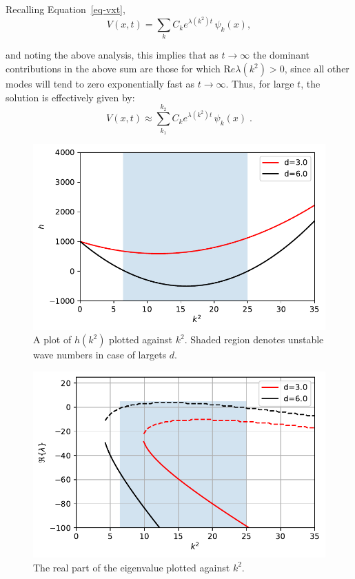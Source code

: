 \documentclass[
  letterpaper,
  DIV=11,
  numbers=noendperiod]{scrreprt}
\theoremstyle{plain}
\theoremstyle{definition}
\theoremstyle{plain}
\theoremstyle{remark}
\begin{document}
Recalling Equation~\ref{eq-vxt},\\
\[
V(x,t) = \sum_k C_k e^{\lambda(k^2) t} \, \psi_k(x),
\]

and noting the above analysis, this implies that as \(t\to \infty\) the
dominant contributions in the above sum are those for which
\({\mathrm Re} \lambda(k^2) > 0\), since all other modes will tend to
zero exponentially fast as \(t\to \infty\). Thus, for large \(t\), the
solution is effectively given by: \[
V(x,t) \approx \sum_{k_{1}}^{k_2} C_k e^{\lambda(k^2) t} \, \psi_k(x) \; .
\]

\begin{figure}

{\centering \includegraphics{DiffusionDrivenInstability_files/figure-pdf/fig-dispersion-output-1.pdf}

}

\caption{\label{fig-dispersion}A plot of \(h(k^2)\) plotted against
\(k^2\). Shaded region denotes unstable wave numbers in case of largets
\(d\).}

\end{figure}

\begin{figure}

{\centering \includegraphics{DiffusionDrivenInstability_files/figure-pdf/fig-dispersion-output-2.pdf}

}

\caption{\label{fig-dispersion}The real part of the eigenvalue plotted
against \(k^2\).}

\end{figure}
\end{document}
